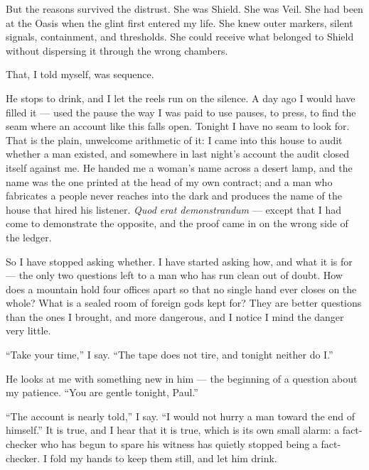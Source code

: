 But the reasons survived the distrust. She was Shield. She was Veil. She had been at the Oasis when the glint first entered my life. She knew outer markers, silent signals, containment, and thresholds. She could receive what belonged to Shield without dispersing it through the wrong chambers.\par

That, I told myself, was sequence.\par

\ornament

He stops to drink, and I let the reels run on the silence. A day ago I would have filled it --- used the pause the way I was paid to use pauses, to press, to find the seam where an account like this falls open. Tonight I have no seam to look for. That is the plain, unwelcome arithmetic of it: I came into this house to audit whether a man existed, and somewhere in last night's account the audit closed itself against me. He handed me a woman's name across a desert lamp, and the name was the one printed at the head of my own contract; and a man who fabricates a people never reaches into the dark and produces the name of the house that hired his listener. \textit{Quod erat demonstrandum} --- except that I had come to demonstrate the opposite, and the proof came in on the wrong side of the ledger.\par

So I have stopped asking whether. I have started asking how, and what it is for --- the only two questions left to a man who has run clean out of doubt. How does a mountain hold four offices apart so that no single hand ever closes on the whole? What is a sealed room of foreign gods kept for? They are better questions than the ones I brought, and more dangerous, and I notice I mind the danger very little.\par

``Take your time,'' I say. ``The tape does not tire, and tonight neither do I.''\par

He looks at me with something new in him --- the beginning of a question about my patience. ``You are gentle tonight, Paul.''\par

``The account is nearly told,'' I say. ``I would not hurry a man toward the end of himself.'' It is true, and I hear that it is true, which is its own small alarm: a fact-checker who has begun to spare his witness has quietly stopped being a fact-checker. I fold my hands to keep them still, and let him drink.\par

